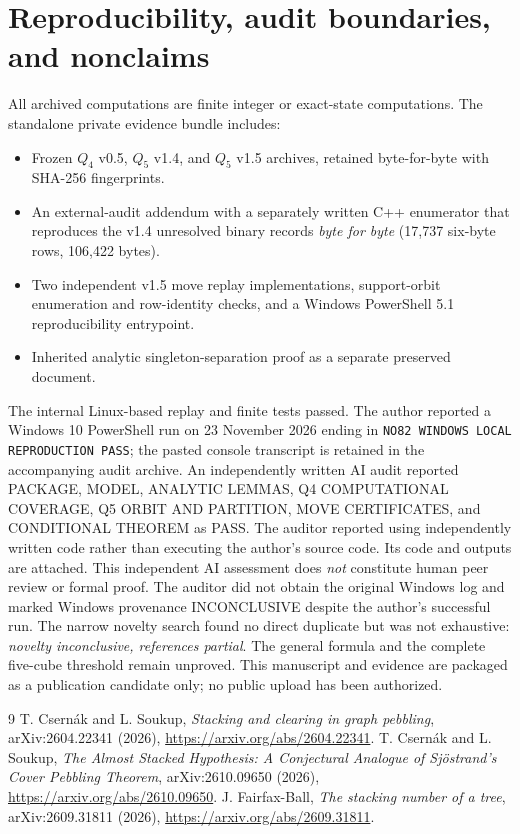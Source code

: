\documentclass[11pt,a4paper]{article}
\begin{document}
\section{Reproducibility, audit boundaries, and nonclaims}\label{sec:cert}
All archived computations are finite integer or exact-state computations. The standalone private evidence bundle includes:
\begin{itemize}
\item Frozen $Q_4$ v0.5, $Q_5$ v1.4, and $Q_5$ v1.5 archives, retained byte-for-byte with SHA-256 fingerprints.
\item An external-audit addendum with a separately written C++ enumerator that reproduces the v1.4 unresolved binary records \emph{byte for byte} (17,737 six-byte rows, 106,422 bytes).
\item Two independent v1.5 move replay implementations, support-orbit enumeration and row-identity checks, and a Windows PowerShell 5.1 reproducibility entrypoint.
\item Inherited analytic singleton-separation proof as a separate preserved document.
\end{itemize}

The internal Linux-based replay and finite tests passed. The author reported a Windows 10 PowerShell run on 23 November 2026 ending in \texttt{NO82 WINDOWS LOCAL REPRODUCTION PASS}; the pasted console transcript is retained in the accompanying audit archive. An independently written AI audit reported PACKAGE, MODEL, ANALYTIC LEMMAS, Q4 COMPUTATIONAL COVERAGE, Q5 ORBIT AND PARTITION, MOVE CERTIFICATES, and CONDITIONAL THEOREM as PASS. The auditor reported using independently written code rather than executing the author's source code. Its code and outputs are attached. This independent AI assessment does \emph{not} constitute human peer review or formal proof. The auditor did not obtain the original Windows log and marked Windows provenance INCONCLUSIVE despite the author's successful run. The narrow novelty search found no direct duplicate but was not exhaustive: \emph{novelty inconclusive, references partial}. The general formula and the complete five-cube threshold remain unproved. This manuscript and evidence are packaged as a publication candidate only; no public upload has been authorized.

\begin{thebibliography}{9}
 T. Csern\'ak and L. Soukup, \emph{Stacking and clearing in graph pebbling}, arXiv:2604.22341 (2026), \url{https://arxiv.org/abs/2604.22341}.
 T. Csern\'ak and L. Soukup, \emph{The Almost Stacked Hypothesis: A Conjectural Analogue of Sj\"ostrand's Cover Pebbling Theorem}, arXiv:2610.09650 (2026), \url{https://arxiv.org/abs/2610.09650}.
 J. Fairfax-Ball, \emph{The stacking number of a tree}, arXiv:2609.31811 (2026), \url{https://arxiv.org/abs/2609.31811}.
\end{thebibliography}
\end{document}
